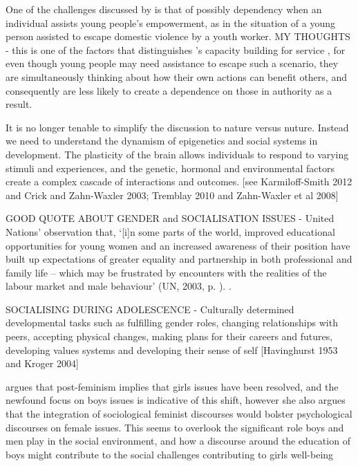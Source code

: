One of the challenges discussed by \citet{Sercombe2010} is that of possibly dependency when an individual assists young people's empowerment, as in the situation of a young person assisted to escape domestic violence by a youth worker. MY THOUGHTS - this is one of the factors that distinguishes \citet{Karlberg2016}'s capacity building for service , for even though young people may need assistance to escape such a scenario, they are simultaneously thinking about how their own actions can benefit others, and consequently are less likely to create a dependence on those in authority as a result.\cite{Sercombe2010}

It is no longer tenable to simplify the discussion to nature versus nuture. Instead we need to understand the dynamism of epigenetics and social systems in development. The plasticity of the brain allows individuals to respond to varying stimuli and experiences, and the genetic, hormonal and environmental factors create a complex cascade of interactions and outcomes. [see Karmiloff-Smith 2012 and Crick and Zahn-Waxler 2003; Tremblay 2010 and Zahn-Waxler et al 2008]\cite{Shute2016}

GOOD QUOTE ABOUT GENDER and SOCIALISATION ISSUES - United Nations’ observation that, ‘[i]n some parts of the world, improved educational opportunities for young women and an increased awareness of their position have built up expectations of greater equality and partnership in both professional and family life – which may be frustrated by encounters with the realities of the labour market and male behaviour’ (UN, 2003, p. ). \citep[][p265]{UnitedNations2003}. %

SOCIALISING DURING ADOLESCENCE - Culturally determined developmental tasks such as fulfilling gender roles, changing relationships with peers, accepting physical changes, making plans for their careers and futures, developing values systems and developing their sense of self [Havinghurst 1953 and Kroger 2004]\cite{Shute2016}

\citet{Shute2016} argues that post-feminism implies that girls issues have been resolved, and the newfound focus on boys issues is indicative of this shift, however she also argues that the integration of sociological feminist discourses would bolster psychological discourses on female issues. This seems to overlook the significant role boys and men play in the social environment, and how a discourse around the education of boys might contribute to the social challenges contributing to girls well-being


